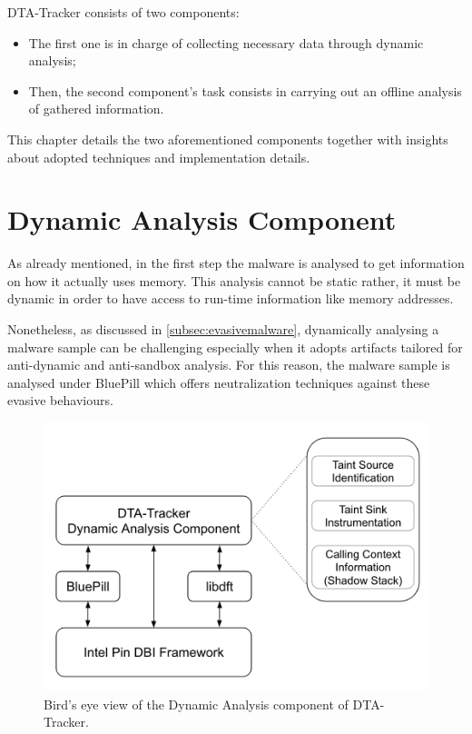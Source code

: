 \documentclass[LaM,binding=0.6cm]{sapthesis}
\begin{document}
{\sf DTA-Tracker} consists of two components: 
\begin{itemize}
\item The first one is in charge of collecting necessary data through dynamic analysis;
\item Then, the second component's task consists in carrying out an offline analysis of gathered information.
\end{itemize}
This chapter details the two aforementioned components together with insights about adopted techniques and implementation details.

\section{Dynamic Analysis Component}
As already mentioned, in the first step the malware is analysed to get information on how it actually uses memory. This analysis cannot be static rather, it must be dynamic in order to have access to run-time information like memory addresses.

Nonetheless, as discussed in \autoref{subsec:evasivemalware}, dynamically analysing a malware sample can be challenging especially when it adopts artifacts tailored for anti-dynamic and anti-sandbox analysis. For this reason, the malware sample is analysed under BluePill which offers neutralization techniques against these evasive behaviours.

\begin{figure}[h!]
\centering
\includegraphics[scale=.6]{images/dtatracker1}
\caption{Bird's eye view of the Dynamic Analysis component of {\sf DTA-Tracker}.}
\end{figure}
\newpage
\end{document}
